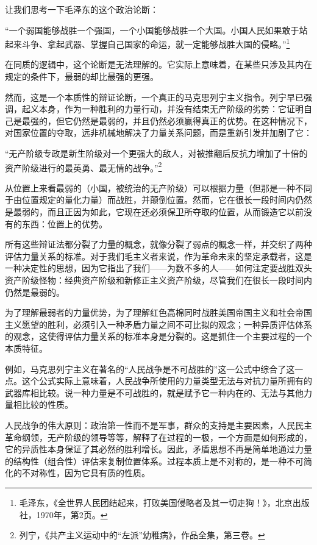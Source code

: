 \documentclass[fontset=fandol, a4paper, 12pt, twoside]{ctexart}
\renewenvironment{quote}
  {\list{}{\rightmargin=0cm \leftmargin=2em}%
   \item\relax\small\kaishu\color{black}}
  {\endlist}
\begin{document}
让我们思考一下毛泽东的这个政治论断：

\begin{quote}
“一个弱国能够战胜一个强国，一个小国能够战胜一个大国。小国人民如果敢于站起来斗争、拿起武器、掌握自己国家的命运，就一定能够战胜大国的侵略。”\footnote{毛泽东，《全世界人民团结起来，打败美国侵略者及其一切走狗！》，北京出版社，1970年，第2页。}
\end{quote}

在同质的逻辑中，这个论断是无法理解的。它实际上意味着，在某些只涉及其内在规定的条件下，最弱的却比最强的更强。

然而，这是一个本质性的辩证论断，一个真正的马克思列宁主义指令。列宁早已强调，起义本身，作为一种胜利的力量行动，并没有结束无产阶级的劣势：它证明自己是最强的，但它仍然是最弱的，并且仍然必须赢得真正的优势。在这种情况下，对国家位置的夺取，远非机械地解决了力量关系问题，而是重新引发并加剧了它：

\begin{quote}
“无产阶级专政是新生阶级对一个更强大的敌人，对被推翻后反抗力增加了十倍的资产阶级进行的最英勇、最无情的战争。”\footnote{列宁，《共产主义运动中的“左派”幼稚病》，作品全集，第三卷。}
\end{quote}

从位置上来看最弱的（小国，被统治的无产阶级）可以根据力量（但那是一种不同于由位置规定的量化力量）而战胜，并颠倒位置。然而，它在很长一段时间内仍然是最弱的，而且正因为如此，它现在还必须保卫所夺取的位置，从而锻造它以前没有的东西：位置上的优势。

所有这些辩证法都分裂了力量的概念，就像分裂了弱点的概念一样，并交织了两种评估力量关系的标准。对于我们毛主义者来说，作为革命未来的坚定承载者，这是一种决定性的思想，因为它指出了我们——为数不多的人——如何注定要战胜双头资产阶级怪物：经典资产阶级和新修正主义资产阶级，尽管我们在很长一段时间内仍然是最弱的。

为了理解最弱者的力量优势，为了理解红色高棉同时战胜美国帝国主义和社会帝国主义愿望的胜利，必须引入一种矛盾力量之间不可比拟的观念；一种异质评估体系的观念，这使得评估力量关系的标准本身是分裂的。这是抓住一个主要过程的一个本质特征。

例如，马克思列宁主义在著名的“人民战争是不可战胜的”这一公式中综合了这一点。这个公式实际上意味着，人民战争所使用的力量类型无法与对抗力量所拥有的武器库相比较。说一种力量是不可战胜的，就是赋予它一种内在的、无法与其他力量相比较的性质。

人民战争的伟大原则：政治第一性而不是军事，群众的支持是主要因素，人民民主革命纲领，无产阶级的领导等等，解释了在过程的一极，一个方面是如何形成的，它的异质性本身保证了其必然的胜利增长。因此，矛盾思想不再是简单地通过力量的结构性（组合性）评估来复制位置体系。过程本质上是不对称的，是一种不可简化的不对称性，因为它具有质的性质。
\end{document}

